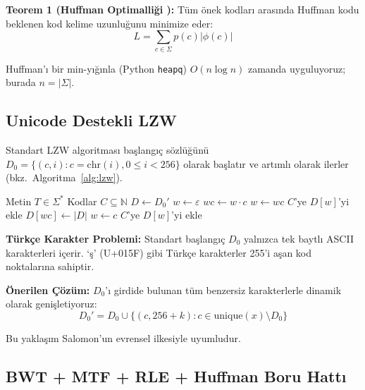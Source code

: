 \documentclass[conference]{IEEEtran}
\begin{document}
\noindent\textbf{Teorem 1 (Huffman Optimalliği \cite{huffman1952}):} Tüm önek kodları arasında Huffman kodu beklenen kod kelime uzunluğunu minimize eder:
\begin{equation}
L = \sum_{c \in \Sigma} p(c) |\phi(c)|
\label{eq:huffman_length}
\end{equation}

Huffman'ı bir min-yığınla (Python \texttt{heapq}) \(O(n \log n)\) zamanda uyguluyoruz; burada \(n = |\Sigma|\).

\subsection{Unicode Destekli LZW}

Standart LZW \cite{welch1984} algoritması başlangıç sözlüğünü \(D_0 = \{(c, i) : c = \text{chr}(i), 0 \leq i < 256\}\) olarak başlatır ve artımlı olarak ilerler (bkz.\ Algoritma~\ref{alg:lzw}).

\begin{algorithm}
\caption{LZW Kodlama (Unicode Destekli)}
\label{alg:lzw}
\begin{algorithmic}[1]
\REQUIRE Metin \(T \in \Sigma^*\)
\ENSURE Kodlar \(C \subseteq \mathbb{N}\)
\STATE \(D \gets D_0'\) 
\STATE \(w \gets \varepsilon\)
    \STATE \(wc \gets w \cdot c\)
        \STATE \(w \gets wc\)
    \ELSE
        \STATE \(C\)'ye \(D[w]\)'yi ekle
        \STATE \(D[wc] \gets |D|\)
        \STATE \(w \gets c\)
    \ENDIF
\ENDFOR
\STATE \(C\)'ye \(D[w]\)'yi ekle
\end{algorithmic}
\end{algorithm}

\noindent\textbf{Türkçe Karakter Problemi:} Standart başlangıç \(D_0\) yalnızca tek baytlı ASCII karakterleri içerir. `ş' (U+015F) gibi Türkçe karakterler 255'i aşan kod noktalarına sahiptir.

\noindent\textbf{Önerilen Çözüm:} \(D_0\)'ı girdide bulunan tüm benzersiz karakterlerle dinamik olarak genişletiyoruz:
\begin{equation}
D_0' = D_0 \cup \{(c, 256 + k) : c \in \text{unique}(x) \setminus D_0\}
\label{eq:lzw_init}
\end{equation}

Bu yaklaşım Salomon'un \cite{salomon2007} evrensel ilkesiyle uyumludur.

\subsection{BWT + MTF + RLE + Huffman Boru Hattı}
\end{document}
